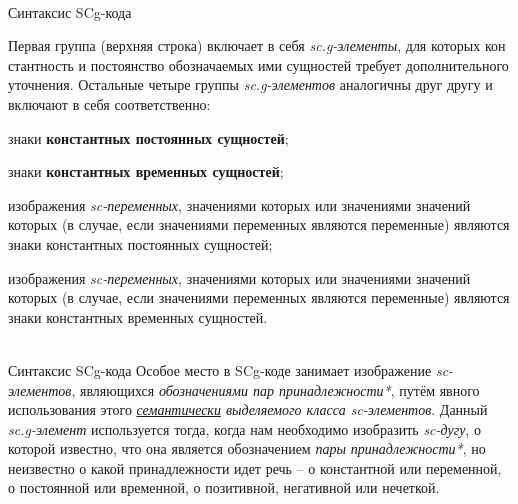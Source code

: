 \begin{frame}{\\Синтаксис SCg-кода}
	\topline
	\justifying
	\vspace*{\fill}\\
	\small{Первая группа (верхняя строка) включает в себя \textit{sc.g-элементы}, для которых кон стантность и постоянство обозначаемых ими сущностей требует дополнительного уточнения. Остальные четыре группы \textit{sc.g-элементов} аналогичны друг другу и включают в себя соответственно:
	\begin{textitemize}
		\item знаки \textbf{константных постоянных сущностей};
		\item знаки \textbf{константных временных сущностей};
		\item изображения \textit{sc-переменных}, значениями которых или значениями значений которых (в случае, если значениями переменных являются переменные) являются знаки константных постоянных сущностей;
		\item изображения \textit{sc-переменных}, значениями которых или значениями значений которых (в случае, если значениями переменных являются переменные) являются знаки константных временных сущностей.
	\end{textitemize}}
\end{frame}

\begin{frame}{\\Синтаксис SCg-кода}
	\topline
	\justifying
	Особое место в SCg-коде занимает изображение \textit{sc-элементов}, являющихся \textit{обозначениями пар принадлежности*}, путём явного использования этого \textit{\underline{семантически} выделяемого класса sc-элементов}. Данный \textit{sc.g-элемент} используется тогда, когда нам необходимо изобразить \textit{sc-дугу}, о которой известно, что она является обозначением \textit{пары принадлежности*}, но неизвестно о какой принадлежности идет речь -- о константной или переменной, о
	постоянной или временной, о позитивной, негативной или нечеткой.
\end{frame}

